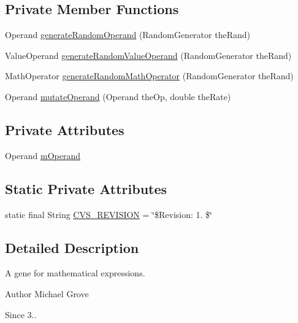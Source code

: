 \subsection*{Private Member Functions}
\begin{DoxyCompactItemize}
\item 
Operand \hyperlink{classexamples_1_1math_1_1ga_1_1_math_gene_ac93098970e24c4926c6977694cec4fa0}{generate\-Random\-Operand} (Random\-Generator the\-Rand)
\item 
Value\-Operand \hyperlink{classexamples_1_1math_1_1ga_1_1_math_gene_aa64dabb9eae582faa4e3372c5d15f551}{generate\-Random\-Value\-Operand} (Random\-Generator the\-Rand)
\item 
Math\-Operator \hyperlink{classexamples_1_1math_1_1ga_1_1_math_gene_ac300f7b3ea9e9571c7563059cbbf9ffe}{generate\-Random\-Math\-Operator} (Random\-Generator the\-Rand)
\item 
Operand \hyperlink{classexamples_1_1math_1_1ga_1_1_math_gene_add3090f1779669a662e8c9ed10d66f7b}{mutate\-Operand} (Operand the\-Op, double the\-Rate)
\end{DoxyCompactItemize}
\subsection*{Private Attributes}
\begin{DoxyCompactItemize}
\item 
Operand \hyperlink{classexamples_1_1math_1_1ga_1_1_math_gene_acac7063050fff879714848da92effe43}{m\-Operand}
\end{DoxyCompactItemize}
\subsection*{Static Private Attributes}
\begin{DoxyCompactItemize}
\item 
static final String \hyperlink{classexamples_1_1math_1_1ga_1_1_math_gene_a509b38c71a048d55425eb1066f4a61d7}{C\-V\-S\-\_\-\-R\-E\-V\-I\-S\-I\-O\-N} = \char`\"{}\$Revision\-: 1. \$\char`\"{}
\end{DoxyCompactItemize}


\subsection{Detailed Description}
A gene for mathematical expressions.

\begin{DoxyAuthor}{Author}
Michael Grove 
\end{DoxyAuthor}
\begin{DoxySince}{Since}
3.. 
\end{DoxySince}


